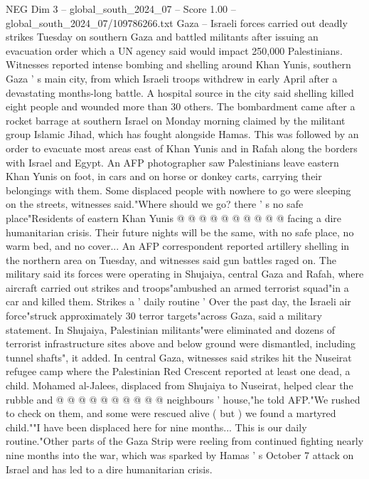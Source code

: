 \begin{textsample}{NEG Dim 3 – global\_south\_2024\_07 – Score 1.00 – global\_south\_2024\_07/109786266.txt}  \label{ex:f3_neg_144}
Gaza -- Israeli forces carried out deadly strikes Tuesday on southern Gaza and battled militants after issuing an evacuation order which a UN agency said would impact 250,000 Palestinians.
Witnesses reported intense bombing and shelling around Khan Yunis, southern Gaza ' s main city, from which Israeli troops withdrew in early April after a devastating months-long battle.
A hospital source in the city said shelling killed eight people and wounded more than 30 others.
The bombardment came after a rocket barrage at southern Israel on Monday morning claimed by the militant group Islamic Jihad, which has fought alongside Hamas.
This was followed by an order to evacuate most areas east of Khan Yunis and in Rafah along the borders with Israel and Egypt.
An AFP photographer saw Palestinians leave eastern Khan Yunis on foot, in cars and on horse or donkey carts, carrying their belongings with them.
Some displaced people with nowhere to go were sleeping on the streets, witnesses said."Where should we go? there ' s no safe place"Residents of eastern Khan Yunis @ @ @ @ @ @ @ @ @ @ facing a dire humanitarian crisis.
Their future nights will be the same, with no safe place, no warm bed, and no cover...
An AFP correspondent reported artillery shelling in the northern area on Tuesday, and witnesses said gun battles raged on.
The military said its forces were operating in Shujaiya, central Gaza and Rafah, where aircraft carried out strikes and troops"ambushed an armed terrorist squad"in a car and killed them.
Strikes a ' daily routine ' Over the past day, the Israeli air force"struck approximately 30 terror targets"across Gaza, said a military statement.
In Shujaiya, Palestinian militants"were eliminated and dozens of terrorist infrastructure sites above and below ground were dismantled, including tunnel shafts", it added.
In central Gaza, witnesses said strikes hit the Nuseirat refugee camp where the Palestinian Red Crescent reported at least one dead, a child.
Mohamed al-Jalees, displaced from Shujaiya to Nuseirat, helped clear the rubble and @ @ @ @ @ @ @ @ @ @ neighbours ' house,"he told AFP."We rushed to check on them, and some were rescued alive ( but ) we found a martyred child.""I have been displaced here for nine months...
This is our daily routine."Other parts of the Gaza Strip were reeling from continued fighting nearly nine months into the war, which was sparked by Hamas ' s October 7 attack on Israel and has led to a dire humanitarian crisis.

\end{textsample}
